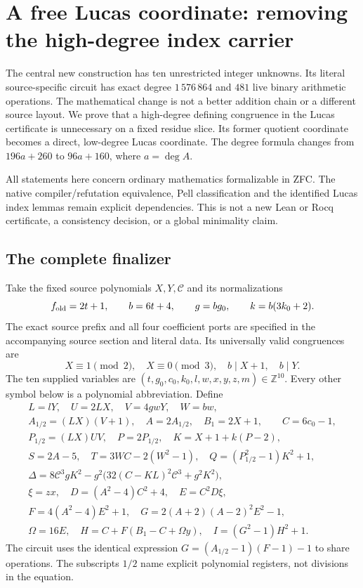 \providecommand{\FreeCMainDegree}{1\,576\,864}
\providecommand{\FreeCMainOps}{481}
\providecommand{\FreeCParameterDegree}{16\,424}
\section{A free Lucas coordinate: removing the high-degree index carrier}
\label{sec:free-lucas-coordinate}

The central new construction has ten unrestricted integer unknowns.
Its literal source-specific circuit has exact degree $\FreeCMainDegree$ and
$\FreeCMainOps$ live binary arithmetic operations. The mathematical change
is not a better addition chain or a different source layout. We prove that
a high-degree defining congruence in the Lucas certificate is unnecessary
on a fixed residue slice. Its former quotient coordinate becomes a direct,
low-degree Lucas coordinate. The degree formula changes from
$196a+260$ to $96a+160$, where $a=\deg A$.

All statements here concern ordinary mathematics formalizable in ZFC.
The native compiler/refutation equivalence, Pell classification and the
identified Lucas index lemmas remain explicit dependencies. This is not a
new Lean or Rocq certificate, a consistency decision, or a global minimality
claim.

\subsection{The complete finalizer}

Take the fixed source polynomials $X,Y,\mathcal C$ and its normalizations
\[
 f_{\rm old}=2t+1,\qquad b=6t+4,\qquad
 g=bg_0,\qquad k=b(3k_0+2).
\]
The exact source prefix and all four coefficient ports are specified in the
accompanying source section and literal data. Its universally valid
congruences are
\[
 X\equiv1\pmod2,\quad X\equiv0\pmod3,\quad
 b\mid X+1,\quad b\mid Y.
\]
The ten supplied variables are
$(t,g_0,c_0,k_0,l,w,x,y,z,m)\in\mathbb Z^{10}$. Every other symbol below
is a polynomial abbreviation. Define
\begin{gather*}
 L=lY,\quad U=2LX,\quad V=4gwY,\quad W=bw,\\
 A_{1/2}=(LX)(V+1),\quad A=2A_{1/2},\quad B_1=2X+1,
 \qquad \boxed{C=6c_0-1},\\
 P_{1/2}=(LX)UV,\quad P=2P_{1/2},\quad
 K=X+1+k(P-2),\\
 S=2A-5,\quad T=3WC-2(W^2-1),\quad
 Q=(P_{1/2}^2-1)K^2+1,\\
 \Delta=8\mathcal C^3gK^2-g^2
       \bigl(32(C-KL)^2\mathcal C^3+g^2K^2\bigr),\\
 \xi=zx,\quad D=(A^2-4)C^2+4,\quad E=C^2D\xi,\\
 F=4(A^2-4)E^2+1,\quad
 G=2(A+2)(A-2)^2E^2-1,\\
 \Omega=16E,\quad H=C+F(B_1-C+\Omega y),\quad
 I=(G^2-1)H^2+1.
\end{gather*}
The circuit uses the identical expression
$G=(A_{1/2}-1)(F-1)-1$ to share operations. The subscripts $1/2$ name
explicit polynomial registers, not divisions in the equation.

